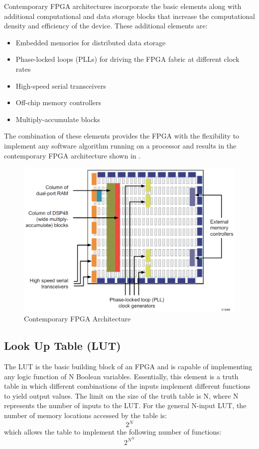 \clearpage


Contemporary FPGA architectures incorporate the basic elements along with additional
computational and data storage blocks that increase the computational density and
efficiency of the device. These additional elements are:
\begin{itemize}
  \item Embedded memories for distributed data storage
  \item Phase-locked loops (PLLs) for driving the FPGA fabric at different clock rates
  \item High-speed serial transceivers
  \item Off-chip memory controllers
  \item Multiply-accumulate blocks
\end{itemize}

The combination of these elements provides the FPGA with the flexibility to implement any
software algorithm running on a processor and results in the contemporary FPGA architecture shown in .

\begin{figure}[H]
  \begin{center}
      \includegraphics[width=\textwidth]{images/ContempFPGAArch.png}
      \caption{Contemporary FPGA Architecture}
      \label{ContempFPGAArch}
  \end{center}
\end{figure}

\clearpage
\subsection{Look Up Table (LUT)}
The LUT is the basic building block of an FPGA and is capable of implementing any logic
function of N Boolean variables. Essentially, this element is a truth table in which different
combinations of the inputs implement different functions to yield output values. The limit
on the size of the truth table is N, where N represents the number of inputs to the LUT. For
the general N-input LUT, the number of memory locations accessed by the table is:
\[ 2^{N} \]
which allows the table to implement the following number of functions:
\[ 2^{N^{N}} \]

